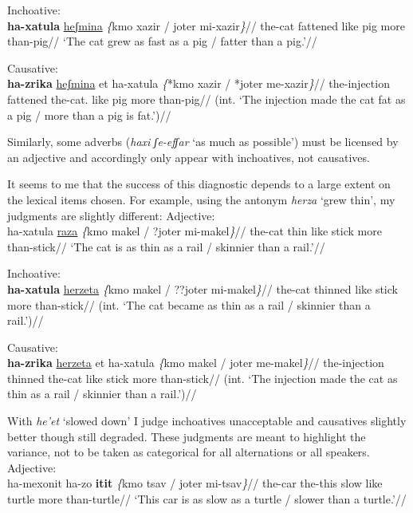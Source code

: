   \a Inchoative:\\ \begingl
    \gla \textbf{ha-xatula} \underline{heʃmina} \emph{\{}kmo xazir / joter mi-xazir\emph{\}}//
    \glb the-cat fattened like pig {} more than-pig//
    \glft `The cat grew as fast as a pig / fatter than a pig.'//
  \endgl

  \a Causative:\\ \begingl
    \gla \ljudge{*}\textbf{ha-zrika} \underline{heʃmina} et ha-xatula \emph{\{}*kmo xazir / *joter me-xazir\emph{\}}//
    \glb the-injection fattened  the-cat. like pig {} more than-pig//
    \glft (int. `The injection made the cat fat as a pig / more than a pig is fat.')//
  \endgl
\xe

Similarly, some adverbs (\emph{haxi ʃe-efʃar} `as much as possible') must be licensed by an adjective and accordingly only appear with inchoatives, not causatives.

It seems to me that the success of this diagnostic depends to a large extent on the lexical items chosen. For example, using the antonym \emph{herza} `grew thin', my judgments are slightly different:
\pex
  \a Adjective:\\ \begingl
    \gla ha-xatula \underline{raza} \emph{\{}kmo makel / ?joter mi-makel\emph{\}}//
    \glb the-cat thin like stick {} more than-stick//
    \glft `The cat is as thin as a rail / skinnier than a rail.'//
  \endgl
  
  \a Inchoative:\\ \begingl
    \gla{}\textbf{ha-xatula} \underline{herzeta} \emph{\{}kmo makel / ??joter mi-makel\emph{\}}//
    \glb the-cat thinned like stick {} more than-stick//
    \glft (int. `The cat became as thin as a rail / skinnier than a rail.')//
  \endgl

  \a Causative:\\ \begingl
    \gla {}\textbf{ha-zrika} \underline{herzeta} et ha-xatula \emph{\{}kmo makel / joter me-makel\emph{\}}//
    \glb the-injection thinned  the-cat like stick {} more than-stick//
    \glft (int. `The injection made the cat as thin as a rail / skinnier than a rail.')//
  \endgl
\xe

With \emph{he'et} `slowed down' I judge inchoatives unacceptable and causatives slightly better though still degraded. These judgments are meant to highlight the variance, not to be taken as categorical for all alternations or all speakers.
\pex
	\a Adjective:\\ \begingl
		\gla ha-mexonit ha-zo \textbf{itit} \emph{\{}kmo tsav / joter mi-tsav\emph{\}}//
		\glb the-car the-this slow like turtle {} more than-turtle//
		\glft `This car is as slow as a turtle / slower than a turtle.'//
	\endgl

